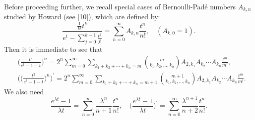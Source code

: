 \documentclass[a4paper,11pt]{amsart}
\begin{document}
Before proceeding further, we recall special cases of Bernoulli-Pad\'e numbers $A_{k,n}$ studied by Howard (see [10]), which are defined by:
\begin{equation*}
\frac{\frac{1}{k!}t^{k}}{e^{t}-\sum_{j=0}^{k-1}\frac{t^{j}}{j!}}=\sum_{n=0}^{\infty}A_{k,n}\frac{t^{n}}{n!}, \quad (A_{k,0}=1).
\end{equation*}
Then it is immediate to see that
\begin{align} 
&\bigg(\frac{t^{2}}{e^{t}-1-t}\bigg)^{n}=2^{n}\sum_{m=0}^{\infty}\sum_{k_1+k_2+\cdots+k_n=m}\binom{m}{k_1,k_2,\dots,k_n}A_{2,k_1}A_{k_2}\cdots A_{k_n}\frac{t^{m}}{m!}, \label{52} \\
&\bigg(\bigg(\frac{t^{2}}{e^{t}-1-t}\bigg)^{n}\bigg)^{\prime}=2^{n}\sum_{m=0}^{\infty}\sum_{k_1+k_2+\cdots+k_n=m+1}\binom{m+1}{k_1,k_2,\dots,k_n}A_{2,k_1}A_{k_2}\cdots A_{k_n}\frac{t^{m}}{m!}. \label{53}
\end{align}
We also need 
\begin{equation} \label{54}
\frac{e^{\lambda t}-1}{\lambda t}=\sum_{n=0}^{\infty}\frac{\lambda^{n}}{n+1}\frac{t^{n}}{n!}, \quad
\bigg(\frac{e^{\lambda t}-1}{\lambda t}\bigg)^{\prime}=\sum_{n=0}^{\infty}\frac{\lambda^{n+1}}{n+2}\frac{t^{n}}{n!}.
\end{equation}
\end{document}
